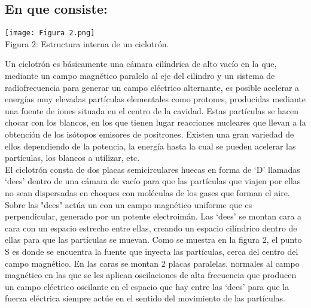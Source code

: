 \documentclass[12pt]{article}
\begin{document}
			\subsection{En que consiste:}\label{subsec:En que consiste:}
				\begin{center}
					\texttt{[image: Figura 2.png]}\\
					Figura 2: Estructura interna de un ciclotrón. \cite{bib:item2}
				\end{center}
				Un ciclotrón es básicamente una cámara cilíndrica de alto vacío en la que, mediante un campo 
				magnético paralelo al eje del cilindro y un sistema de radiofrecuencia para generar un campo 
				eléctrico alternante, es posible acelerar a energías muy elevadas partículas elementales como 
				protones, producidas mediante una fuente de iones situada en el centro de la cavidad. Estas 
				partículas se hacen chocar con los blancos, en los que tienen lugar reacciones nucleares que 
				llevan a la obtención de los isótopos emisores de positrones. Existen una gran variedad de 
				ellos dependiendo de la potencia, la energía hasta la cual se pueden acelerar las partículas, 
				los blancos a utilizar, etc. \\
				El ciclotrón consta de dos placas semicirculares huecas en forma de ‘D’ llamadas ‘dees’ dentro 
				de una cámara de vacío para que las partículas que viajen por ellas no sean dispersadas en 
				choques con moléculas de los gases que forman el aire. Sobre las "dees" actúa un con un campo 
				magnético uniforme que es perpendicular, generado por un potente electroimán. Las ‘dees’ se montan 
				cara a cara con un espacio estrecho entre ellas, creando un espacio cilíndrico dentro de ellas 
				para que las partículas se muevan. Como se muestra en la figura 2, el punto S es donde se 
				encuentra la fuente que inyecta las partículas, cerca del centro del campo magnético. En las caras 
				se montan 2 placas paralelas, normales al campo magnético en las que se les aplican oscilaciones 
				de alta frecuencia que producen un campo eléctrico oscilante en el espacio que hay entre las ‘dees’ 
				para que la fuerza eléctrica siempre actúe en el sentido del movimiento de las partículas.
\end{document}
